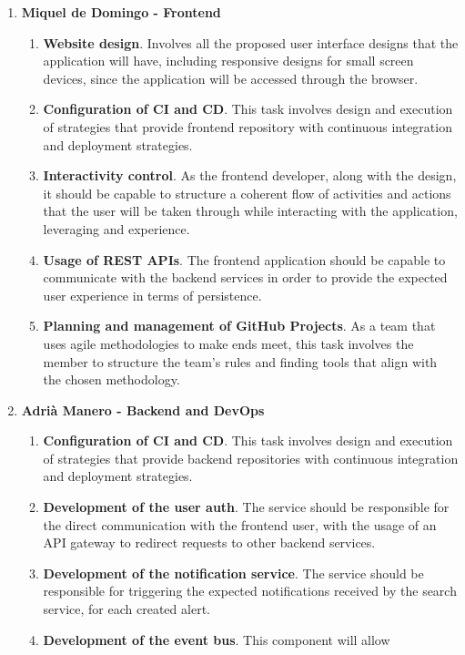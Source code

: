 \documentclass[../memory.tex]{subfiles}
\begin{document}
\begin{enumerate}[label =]
	\item\textbf{Miquel de Domingo - Frontend}
	\begin{enumerate}[label = -]
		\item\textbf{Website design}. Involves all the proposed user interface
		designs that the application will have, including responsive designs
		for small screen devices, since the application will be accessed
		through the browser.
		\item\textbf{Configuration of CI and CD}. This task involves design and
		execution of strategies that provide frontend repository with
		continuous integration and deployment strategies.
		\item\textbf{Interactivity control}. As the frontend developer, along
		with the design, it should be capable to structure a coherent flow of
		activities and actions that the user will be taken through while
		interacting with the application, leveraging and experience.
		\item\textbf{Usage of REST APIs}. The frontend application should be
		capable to communicate with the backend services in order to provide
		the expected user experience in terms of persistence.
		\item\textbf{Planning and management of GitHub Projects}. As a team that
		uses agile methodologies to make ends meet, this task involves the
		member to structure the team's rules and finding tools that align with
		the chosen methodology.
	\end{enumerate}
	\item\textbf{Adrià Manero - Backend and DevOps}
	\begin{enumerate}[label = -]
		\item\textbf{Configuration of CI and CD}. This task involves design and
		execution of strategies that provide backend repositories with
		continuous integration and deployment strategies.
		\item\textbf{Development of the user auth}. The service should be
		responsible for the direct communication with the frontend user, with
		the usage of an API gateway to redirect requests to other backend
		services.
		\item\textbf{Development of the notification service}. The service should
		be responsible for triggering the expected notifications received by
		the search service, for each created alert.
		\item\textbf{Development of the event bus}. This component will allow

\end{enumerate}
\end{enumerate}
\end{document}
